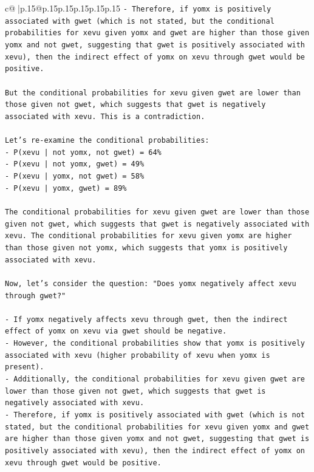 \documentclass{article}
\begin{document}
{\begin{supertabular}{c@{$\;$}|p{.15\linewidth}@{}p{.15\linewidth}p{.15\linewidth}p{.15\linewidth}p{.15\linewidth}p{.15\linewidth}}
{{{\texttt{{-}   Therefore, if yomx is positively associated with gwet (which is not stated, but the conditional probabilities for xevu given yomx and gwet are higher than those given yomx and not gwet, suggesting that gwet is positively associated with xevu), then the indirect effect of yomx on xevu through gwet would be positive.} \\
\\ 
\texttt{But the conditional probabilities for xevu given gwet are lower than those given not gwet, which suggests that gwet is negatively associated with xevu. This is a contradiction.} \\
\\ 
\texttt{Let's re{-}examine the conditional probabilities:} \\
\texttt{{-}   P(xevu | not yomx, not gwet) = 64\%} \\
\texttt{{-}   P(xevu | not yomx, gwet) = 49\%} \\
\texttt{{-}   P(xevu | yomx, not gwet) = 58\%} \\
\texttt{{-}   P(xevu | yomx, gwet) = 89\%} \\
\\ 
\texttt{The conditional probabilities for xevu given gwet are lower than those given not gwet, which suggests that gwet is negatively associated with xevu. The conditional probabilities for xevu given yomx are higher than those given not yomx, which suggests that yomx is positively associated with xevu.} \\
\\ 
\texttt{Now, let's consider the question: "Does yomx negatively affect xevu through gwet?"} \\
\\ 
\texttt{{-}   If yomx negatively affects xevu through gwet, then the indirect effect of yomx on xevu via gwet should be negative.} \\
\texttt{{-}   However, the conditional probabilities show that yomx is positively associated with xevu (higher probability of xevu when yomx is present).} \\
\texttt{{-}   Additionally, the conditional probabilities for xevu given gwet are lower than those given not gwet, which suggests that gwet is negatively associated with xevu.} \\
\texttt{{-}   Therefore, if yomx is positively associated with gwet (which is not stated, but the conditional probabilities for xevu given yomx and gwet are higher than those given yomx and not gwet, suggesting that gwet is positively associated with xevu), then the indirect effect of yomx on xevu through gwet would be positive.} \\
}}}
\end{supertabular}}
\end{document}
